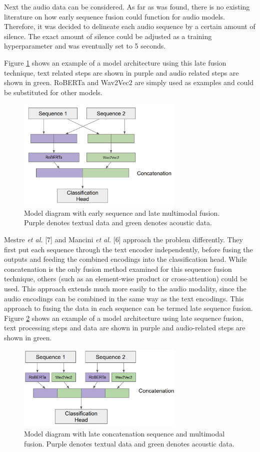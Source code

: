 \documentclass[twocolumn]{article}
\begin{document}
Next the audio data can be considered. As far as was found, there is no
existing literature on how early sequence fusion could function for
audio models. Therefore, it was decided to delineate each audio sequence
by a certain amount of silence. The exact amount of silence could be
adjusted as a training hyperparameter and was eventually set to 5
seconds.

Figure \ref{fig:model-diag-early} shows an example of a model
architecture using this late fusion technique, text related steps are
shown in purple and audio related steps are shown in green. RoBERTa and
Wav2Vec2 are simply used as examples and could be substituted for other
models.

\begin{figure}[h]
\centering
\includegraphics[width=8cm]{model-diag-early}
\caption{Model diagram with early sequence and late multimodal fusion. Purple denotes textual data and green denotes acoustic data.\label{fig:model-diag-early}}
\end{figure}

Mestre \emph{et al.} {[}7{]} and Mancini \emph{et al.} {[}6{]} approach
the problem differently. They first put each sequence through the text
encoder independently, before fusing the outputs and feeding the
combined encodings into the classification head. While concatenation is
the only fusion method examined for this sequence fusion technique,
others (such as an element-wise product or cross-attention) could be
used. This approach extends much more easily to the audio modality,
since the audio encodings can be combined in the same way as the text
encodings. This approach to fusing the data in each sequence can be
termed late sequence fusion. Figure \ref{fig:model-diag-late} shows an
example of a model architecture using late sequence fusion, text
processing steps and data are shown in purple and audio-related steps
are shown in green.

\begin{figure}[h]
\centering
\includegraphics[width=8cm]{model-diag-late}
\caption{Model diagram with late concatenation sequence and multimodal fusion. Purple denotes textual data and green denotes acoustic data.\label{fig:model-diag-late}}
\end{figure}
\end{document}
